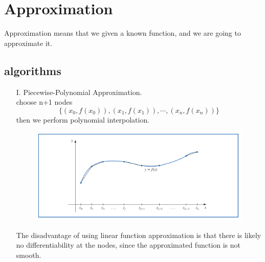 \section{Approximation}
Approximation means that we given a known function, and we are going to approximate it. 

\subsection{algorithms}
\begin{enumerate}
	\item [I.]
	Piecewise-Polynomial Approximation.\\
	choose n+1 nodes 
	\[ \{ (x_0, f(x_0)), (x_1, f(x_1)),\cdots, (x_n, f(x_n))\} \]
	then we perform polynomial interpolation.
	\begin{figure} [h]
		\centering
		\includegraphics*[width = 13cm]{img/piecewise_interpolation.png}
	\end{figure}
	\begin{warning}
		The disadvantage of using linear function approximation is that there is likely no differentiability at the nodes, since the approximated function is not smooth.
	\end{warning}
	

\end{enumerate}
